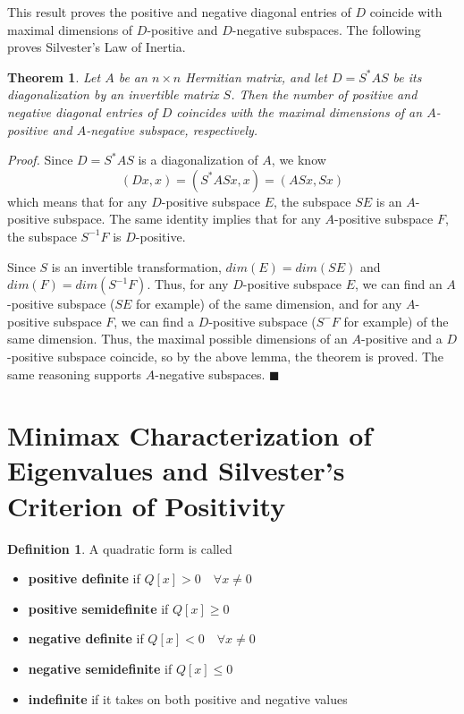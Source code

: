 \documentclass[a4paper,10pt]{book}
\theoremstyle{plain}
\newtheorem{theorem}{Theorem}[section]
\renewenvironment{proof}{\textsl{Proof.}}{\hfill$\blacksquare$}
\theoremstyle{plain}
\theoremstyle{definition}
\newtheorem{definition}{Definition}[section]
\begin{document}
This result proves the positive and negative diagonal entries of $D$ coincide with maximal dimensions of $D$-positive and $D$-negative subspaces. The following proves Silvester's Law of Inertia. 

\begin{theorem}
Let $A$ be an $n \times n$ Hermitian matrix, and let $D = S^{*} AS$ be its diagonalization by an invertible matrix $S$. Then the number of positive and negative diagonal entries of $D$ coincides with the maximal dimensions of an $A$-positive and $A$-negative subspace, respectively. 
\end{theorem}

\begin{proof}
Since $D = S^{*}AS$ is a diagonalization of $A$, we know 
$$(Dx, x) = (S^{*}ASx, x) = (ASx, Sx)$$
which means that for any $D$-positive subspace $E$, the subspace $SE$ is an $A$-positive subspace. The same identity implies that for any $A$-positive subspace $F$, the subspace $S^{-1}F$ is $D$-positive. 

Since $S$ is an invertible transformation, $dim(E) = dim(SE)$ and $dim(F) = dim(S^{-1}F)$. Thus, for any $D$-positive subspace $E$, we can find an $A$-positive subspace ($SE$ for example) of the same dimension, and for any $A$-positive subspace $F$, we can find a $D$-positive subspace ($S^{-}F$ for example) of the same dimension. Thus, the maximal possible dimensions of an $A$-positive and a $D$-positive subspace coincide, so by the above lemma, the theorem is proved. The same reasoning supports $A$-negative subspaces. 
\end{proof}

\section{Minimax Characterization of Eigenvalues and Silvester's Criterion of Positivity}

\begin{definition}
A quadratic form is called 
\begin{itemize}
	\item \textbf{positive definite} if $Q[x] > 0 \quad \forall x \neq 0$
	\item \textbf{positive semidefinite} if $Q[x] \geq 0$
	\item \textbf{negative definite} if $Q[x] < 0 \quad \forall x \neq 0$ 
	\item \textbf{negative semidefinite} if $Q[x] \leq 0$ 
	\item \textbf{indefinite} if it takes on both positive and negative values 
\end{itemize}
\end{definition}
\end{document}
